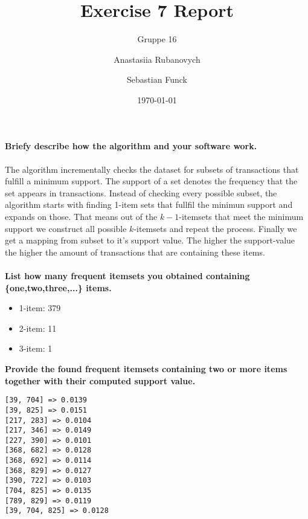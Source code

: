 \documentclass[a4paper,english,abstract=on]{scrartcl}
\title{Exercise 7 Report}
\subtitle{Gruppe 16}
\author{Anastasiia Rubanovych\and Sebastian Funck}
\date{\today}
\begin{document}
\maketitle

\textbf{Briefy describe how the algorithm and your software work.}
~\\~\\
The algorithm incrementally checks the dataset for subsets of transactions that fulfill a minimum support. The support of a set denotes the frequency that the set appears in transactions. Instead of checking every possible subset, the algorithm starts with finding 1-item sets that fullfil the minimun support and expands on those. That means out of the $k-1$-itemsets that meet the minimum support we construct all possible $k$-itemsets and repeat the process. Finally we get a mapping from subset to it's support value. The higher the support-value the higher the amount of transactions that are containing these items.
~\\~\\
\textbf{List how many frequent itemsets you obtained containing \{one,two,three,...\} items.}
\begin{itemize}
	\item 1-item: 379
	\item 2-item: 11
	\item 3-item: 1
\end{itemize}

\newpage
\textbf{Provide the found frequent itemsets containing two or more items together with their computed support value.}
\begin{lstlisting}
[39, 704] => 0.0139
[39, 825] => 0.0151
[217, 283] => 0.0104
[217, 346] => 0.0149
[227, 390] => 0.0101
[368, 682] => 0.0128
[368, 692] => 0.0114
[368, 829] => 0.0127
[390, 722] => 0.0103
[704, 825] => 0.0135
[789, 829] => 0.0119
[39, 704, 825] => 0.0128
\end{lstlisting}
\end{document}
